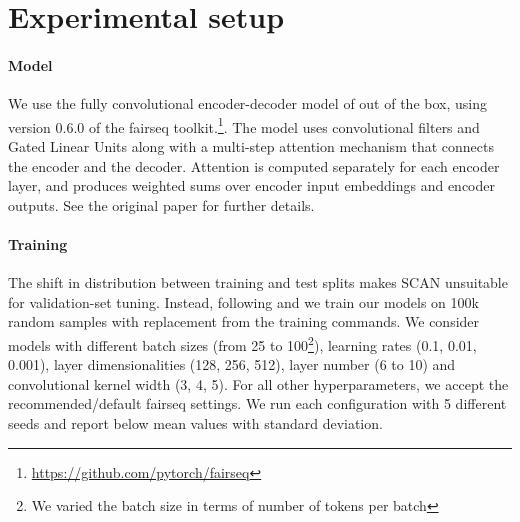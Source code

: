 \fi



\section{Experimental setup}
\paragraph{Model} We use the fully convolutional encoder-decoder model
of  out of the box, using version 0.6.0 of the fairseq 
toolkit.\footnote{\url{https://github.com/pytorch/fairseq}}. The model
uses convolutional filters and Gated Linear Units
\cite{dauphin:etal:2016} along with a multi-step attention mechanism
that connects the encoder and the decoder.  Attention is computed
separately for each encoder layer, and produces weighted sums over
encoder input embeddings and encoder outputs. See the original paper
for further details.

\paragraph{Training} The shift in distribution between training and
test splits makes SCAN unsuitable for validation-set tuning. Instead,
following  and  we
train our models on 100k random samples with replacement from the
training commands. We consider models with different batch sizes (from
25 to 100\footnote{We varied the batch size in terms of number of tokens per batch}), learning rates (0.1, 0.01, 0.001), layer dimensionalities
(128, 256, 512), layer number (6 to 10) and convolutional
kernel width (3, 4, 5). For all other hyperparameters, we accept the
recommended/default fairseq settings. We run each configuration with 5
different seeds and report below mean values with standard deviation.




